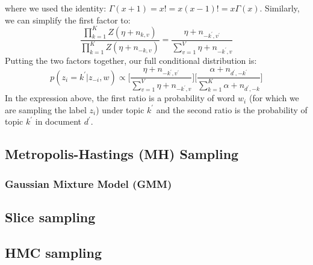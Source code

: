 where we used the identity: $\Gamma(x+1) = x! = x(x-1)! = x\Gamma(x)$. Similarly, we can simplify the first factor to:
\begin{equation}
    \frac{\prod_{k=1}^{K}Z(\eta + n_{k,v})}{\prod_{k=1}^{K}Z(\eta + n_{-k,v})} = \frac{\eta + n_{-k^{\prime}, v^{\prime}}}{\sum_{v=1}^{V}\eta + n_{-k^{\prime}, v}}
\end{equation}
Putting the two factors together, our full conditional distribution is:
\begin{equation}
    p(z_i = k^{\prime}|z_{-i}, w) \propto \bigg[ \frac{\eta + n_{-k^{\prime},v^{\prime}}}{\sum_{v=1}^{V}\eta + n_{-k^{\prime}, v}} \bigg] \bigg[\frac{\alpha + n_{d^{\prime}, -k^{\prime}}}{\sum_{k=1}^{K}\alpha + n_{d^{\prime},-k}} \bigg]
\end{equation}
In the expression above, the first ratio is a probability of word $w_i$ (for which we are sampling the label $z_i$) under topic $k^{\prime}$ and the second ratio is the probability of topic $k^{\prime}$ in document $d^{\prime}$. 

\subsection{Metropolis-Hastings (MH) Sampling}
\subsubsection{Gaussian Mixture Model (GMM)}

\subsection{Slice sampling}
\subsection{HMC sampling}

